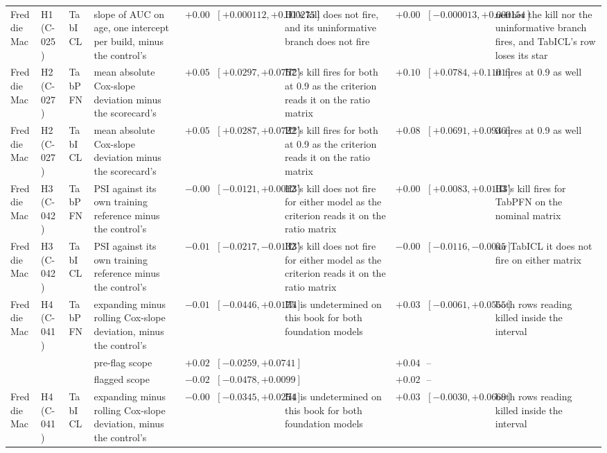 \begin{tabular}{lllp{3.4cm}rlp{3.4cm}rlp{3.4cm}}
Freddie Mac & H1 (C-025) & TabICL & slope of AUC on age, one intercept per build, minus the control's & $+0.000197$ & $[+0.000112, +0.000275]$ & H1's kill does not fire, and its uninformative branch does not fire & $+0.000071$ & $[-0.000013, +0.000154]$ & neither the kill nor the uninformative branch fires, and TabICL's row loses its star \\
Freddie Mac & H2 (C-027) & TabPFN & mean absolute Cox-slope deviation minus the scorecard's & $+0.0553$ & $[+0.0297, +0.0757]$ & H2's kill fires for both at 0.9 as the criterion reads it on the ratio matrix & $+0.1004$ & $[+0.0784, +0.1101]$ & it fires at 0.9 as well \\
Freddie Mac & H2 (C-027) & TabICL & mean absolute Cox-slope deviation minus the scorecard's & $+0.0511$ & $[+0.0287, +0.0722]$ & H2's kill fires for both at 0.9 as the criterion reads it on the ratio matrix & $+0.0844$ & $[+0.0691, +0.0936]$ & it fires at 0.9 as well \\
Freddie Mac & H3 (C-042) & TabPFN & PSI against its own training reference minus the control's & $-0.0052$ & $[-0.0121, +0.0012]$ & H3's kill does not fire for either model as the criterion reads it on the ratio matrix & $+0.0092$ & $[+0.0083, +0.0103]$ & H3's kill fires for TabPFN on the nominal matrix \\
Freddie Mac & H3 (C-042) & TabICL & PSI against its own training reference minus the control's & $-0.0170$ & $[-0.0217, -0.0132]$ & H3's kill does not fire for either model as the criterion reads it on the ratio matrix & $-0.0071$ & $[-0.0116, -0.0045]$ & for TabICL it does not fire on either matrix \\
Freddie Mac & H4 (C-041) & TabPFN & expanding minus rolling Cox-slope deviation, minus the control's & $-0.0162$ & $[-0.0446, +0.0175]$ & H4 is undetermined on this book for both foundation models & $+0.0311$ & $[-0.0061, +0.0555]$ & both rows reading killed inside the interval \\
 &  &  & \quad pre-flag scope & $+0.0227$ & $[-0.0259, +0.0741]$ &  & $+0.0422$ & -- &  \\
 &  &  & \quad flagged scope & $-0.0238$ & $[-0.0478, +0.0099]$ &  & $+0.0258$ & -- &  \\
Freddie Mac & H4 (C-041) & TabICL & expanding minus rolling Cox-slope deviation, minus the control's & $-0.0031$ & $[-0.0345, +0.0254]$ & H4 is undetermined on this book for both foundation models & $+0.0389$ & $[-0.0030, +0.0669]$ & both rows reading killed inside the interval \\

\end{tabular}
